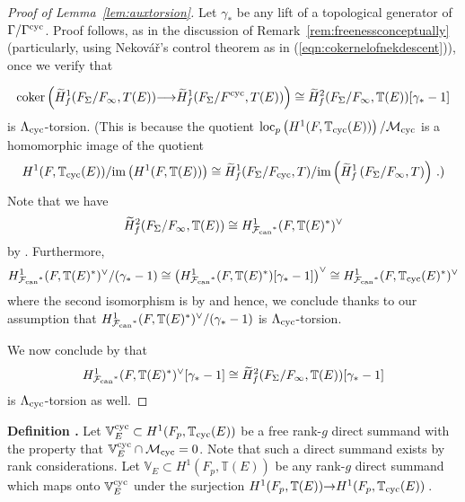 \documentclass[12pt]{amsart}
\numberwithin{equation}{section}
\newenvironment{define}{\par\medskip\noindent\refstepcounter{thm}
\bgroup{\hspace*{-0.15 cm}\bf{Definition}
\thethm.}\bgroup}{\egroup \egroup\par\medskip}
\begin{document}
\begin{proof}[Proof of Lemma~\ref{lem:auxtorsion}]
Let $\gamma_*$ be any lift of a topological generator of $\Gamma/\Gamma^{\textup{cyc}}$. Proof follows, as in the discussion of Remark~\ref{rem:freenessconceptually} (particularly, using Nekov\'a\v{r}'s control theorem as in (\ref{eqn:cokernelofnekdescent})), once we verify that 

\begin{align*}\textup{coker}\left(\widetilde{H}^1_{f}(F_{\Sigma}/F_{\infty},T(E)) {\longrightarrow} \widetilde{H}^1_{f}(F_{\Sigma}/F^{\textup{cyc}},T(E))\right)\cong\widetilde{H}^2_{f}(F_{\Sigma}/F_{\infty},{\mathbb{T}}(E))[\gamma_*-1]
\end{align*}
is ${\Lambda}_{\textup{cyc}}$-torsion. (This is because the quotient $\textup{loc}_p\left(H^1(F,{\mathbb{T}}_{\textup{cyc}}(E))\right)/\mathcal{M}_{\textup{cyc}}$ is a homomorphic image of the quotient 
$$H^1(F,{\mathbb{T}}_{\textup{cyc}}(E))/\textup{im}\left(H^1(F,{\mathbb{T}}(E))\right)\cong \widetilde{H}^1_{f}(F_{\Sigma}/F_{\textup{cyc}},T)/\textup{im}\left(\widetilde{H}^1_{f}\left(F_{\Sigma}/F_{\infty},T\right)\right)\,.)$$
Note that we have  
$$\widetilde{H}^2_{f}(F_{\Sigma}/F_{\infty},{\mathbb{T}}(E))\cong H^1_{{\mathcal{F}_{\textup{\lowercase{can}}}}^*}(F,{\mathbb{T}}(E)^*)^\vee$$ 
by \cite[8.9.6.2]{nekovar06}. Furthermore, 
$$H^1_{{\mathcal{F}_{\textup{\lowercase{can}}}}^*}(F,{\mathbb{T}}(E)^*)^\vee/(\gamma_*-1)\cong  \left(H^1_{{\mathcal{F}_{\textup{\lowercase{can}}}}^*}(F,{\mathbb{T}}(E)^*)[\gamma_*-1]\right)^\vee\cong  H^1_{{\mathcal{F}_{\textup{\lowercase{can}}}}^*}(F,{\mathbb{T}}_{\textup{cyc}}(E)^*)^\vee$$
where the second isomorphism is by \cite[Lemma 3.5.3]{mr02} and hence, we conclude thanks to our assumption that $H^1_{{\mathcal{F}_{\textup{\lowercase{can}}}}^*}(F,{\mathbb{T}}(E)^*)^\vee/(\gamma_*-1)$  is ${\Lambda}_{\textup{cyc}}$-torsion. 

We now conclude by \cite[Lemme I.3.4(ii)]{PR84memoirs} that 
$$H^1_{{\mathcal{F}_{\textup{\lowercase{can}}}}^*}(F,{\mathbb{T}}(E)^*)^\vee[\gamma_*-1]\cong \widetilde{H}^2_{f}(F_{\Sigma}/F_{\infty},{\mathbb{T}}(E))[\gamma_*-1]$$
is ${\Lambda}_{\textup{cyc}}$-torsion as well.
\end{proof}
\begin{define}
\label{def:choosetransverseforE}
Let $\mathbb{V}^{\textup{cyc}}_E \subset H^1(F_p,{\mathbb{T}}_{\textup{cyc}}(E))$ be a free rank-$g$ direct summand with the property that $\mathbb{V}^{\textup{cyc}}_E \cap \mathcal{M}_{\textup{cyc}}=0$. Note that such a direct summand exists by rank considerations. Let $\mathbb{V}_E \subset H^1(F_p,{\mathbb{T}}(E))$ be any  rank-$g$ direct summand which maps onto $\mathbb{V}^{\textup{cyc}}_E$ under the surjection $H^1(F_p,{\mathbb{T}}(E)){\rightarrow} H^1(F_p,{\mathbb{T}}_{\textup{cyc}}(E))$\,.
\end{define}
\end{document}
